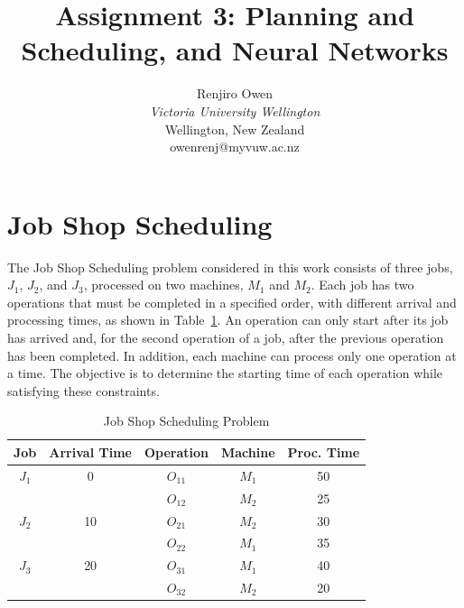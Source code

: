 \documentclass[a4paper,12pt]{article}
\begin{document}
\title{Assignment 3: Planning and Scheduling, and Neural Networks %
}

\author{Renjiro Owen\\
\textit{Victoria University Wellington}\\
Wellington, New Zealand\\
owenrenj@myvuw.ac.nz}

\maketitle
\section{Job Shop Scheduling}

The Job Shop Scheduling problem considered in this work consists of three jobs, $J_1$, $J_2$, and $J_3$, processed on two machines, $M_1$ and $M_2$. Each job has two operations that must be completed in a specified order, with different arrival and processing times, as shown in Table~\ref{tab:jss}. An operation can only start after its job has arrived and, for the second operation of a job, after the previous operation has been completed. In addition, each machine can process only one operation at a time. The objective is to determine the starting time of each operation while satisfying these constraints.

\begin{table}[ht]
	\centering
	\caption{Job Shop Scheduling Problem}
	\label{tab:jss}
	\begin{tabular}{c c c c c}
		\hline
		\textbf{Job} & \textbf{Arrival Time} & \textbf{Operation} & \textbf{Machine} & \textbf{Proc. Time} \\
		\hline
		$J_1$ & 0  & $O_{11}$ & $M_1$ & 50 \\
		&    & $O_{12}$ & $M_2$ & 25 \\
		$J_2$ & 10 & $O_{21}$ & $M_2$ & 30 \\
		&    & $O_{22}$ & $M_1$ & 35 \\
		$J_3$ & 20 & $O_{31}$ & $M_1$ & 40 \\
		&    & $O_{32}$ & $M_2$ & 20 \\
		\hline
	\end{tabular}
\end{table}
\end{document}
